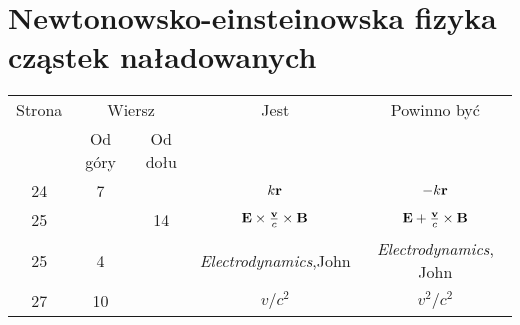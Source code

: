 \documentclass[a4paper,11pt]{article}
\begin{document}
\newpage

\section{Newtonowsko-einsteinowska fizyka cząstek naładowanych}

\vspace{\spaceTwo}




\vspace{0em}



\vspace{0em}












\begin{center}

  \begin{tabular}{|c|c|c|c|c|}
    \hline
    Strona & \multicolumn{2}{c|}{Wiersz} & Jest & Powinno być \\ \cline{2-3}
    & Od góry & Od dołu &  &  \\ \hline
    24 & 7 & & $k \mathbf{r}$ & $-k \mathbf{r}$ \\
    25 & & 14 & $\mathbf{E} \times \frac{ \mathbf{v} }{ c } \times \mathbf{B}$
           & $\mathbf{E} + \frac{ \mathbf{v} }{ c } \times \mathbf{B}$ \\
    25 & 4 & & \textit{Electrodynamics},John
           & \textit{Electrodynamics}, John \\
    27 & 10 & & $v / c^{ 2 }$ & $v^{ 2 } / c^{ 2 }$ \\
    \hline
  \end{tabular}

\end{center}
\end{document}

